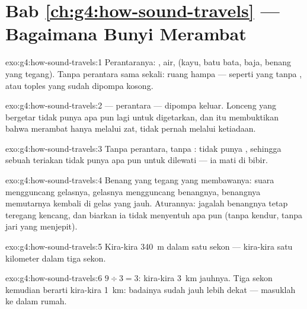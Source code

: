 \section*{Bab \ref{ch:g4:how-sound-travels} --- Bagaimana Bunyi Merambat}

\begin{solution}{exo:g4:how-sound-travels:1}
Perantaranya: , air,  (kayu, batu bata, baja, benang
yang tegang). Tanpa perantara sama sekali: ruang hampa --- seperti
 yang tanpa , atau toples yang sudah dipompa kosong.
\end{solution}

\begin{solution}{exo:g4:how-sound-travels:2}
 --- perantara  --- dipompa keluar. Lonceng yang
bergetar tidak punya apa pun lagi untuk digetarkan, dan itu
membuktikan bahwa  merambat hanya melalui zat, tidak pernah
melalui ketiadaan.
\end{solution}

\begin{solution}{exo:g4:how-sound-travels:3}
Tanpa perantara, tanpa :  tidak punya , sehingga
 sebuah teriakan tidak punya apa pun untuk dilewati --- ia mati
di bibir.
\end{solution}

\begin{solution}{exo:g4:how-sound-travels:4}
Benang yang tegang yang membawanya: suara mengguncang gelasnya,
gelasnya mengguncang benangnya, benangnya memutarnya kembali di gelas
yang jauh. Aturannya: jagalah benangnya tetap teregang kencang, dan
biarkan ia tidak menyentuh apa pun (tanpa kendur, tanpa jari yang
menjepit).
\end{solution}

\begin{solution}{exo:g4:how-sound-travels:5}
Kira-kira \qty{340}{m} dalam satu sekon --- kira-kira satu kilometer dalam tiga sekon.
\end{solution}

\begin{solution}{exo:g4:how-sound-travels:6}
$9 \div 3 = 3$: kira-kira \qty{3}{km} jauhnya. Tiga sekon kemudian
berarti kira-kira \qty{1}{km}: badainya sudah jauh lebih dekat ---
masuklah ke dalam rumah.
\end{solution}

